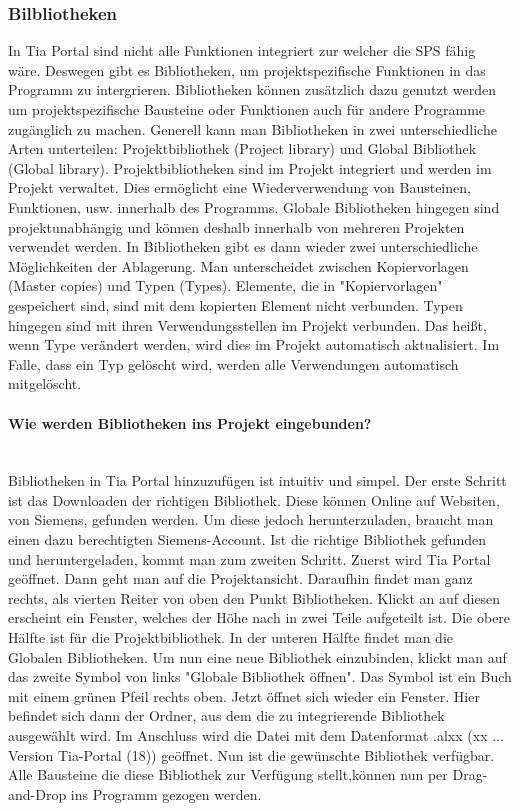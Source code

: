     \subsubsection{Bilbliotheken } \mbox{}
    In Tia Portal sind nicht alle Funktionen integriert zur welcher die SPS fähig wäre. Deswegen gibt es Bibliotheken, um projektspezifische Funktionen in das Programm zu intergrieren. Bibliotheken können zusätzlich dazu genutzt werden um projektspezifische Bausteine oder Funktionen auch für andere Programme zugänglich zu machen. Generell kann man Bibliotheken in zwei unterschiedliche Arten unterteilen: Projektbibliothek (Project library) und Global Bibliothek (Global library). Projektbibliotheken sind im Projekt integriert und werden im Projekt verwaltet. Dies ermöglicht eine Wiederverwendung von Bausteinen, Funktionen, usw. innerhalb des Programms. Globale Bibliotheken hingegen sind projektunabhängig und können deshalb innerhalb von mehreren Projekten verwendet werden. In Bibliotheken gibt es dann wieder zwei unterschiedliche Möglichkeiten der Ablagerung. Man unterscheidet zwischen Kopiervorlagen (Master copies) und Typen (Types). Elemente, die in "Kopiervorlagen" gespeichert sind, sind mit dem kopierten Element nicht verbunden. Typen hingegen sind mit ihren Verwendungsstellen im Projekt verbunden. Das heißt, wenn Type verändert werden, wird dies im Projekt automatisch aktualisiert. Im Falle, dass ein Typ gelöscht wird, werden alle Verwendungen automatisch mitgelöscht.  
    \cite{Programmierleitfaden_für_S7-1500}


        \paragraph{Wie werden Bibliotheken ins Projekt eingebunden?} \mbox{} \\
        \label{Bilbliotheken}
        Bibliotheken in Tia Portal hinzuzufügen ist intuitiv und simpel. Der erste Schritt ist das Downloaden der richtigen Bibliothek. Diese können Online auf Websiten, von Siemens, gefunden werden. Um diese jedoch herunterzuladen, braucht man einen dazu berechtigten Siemens-Account. Ist die richtige Bibliothek gefunden und heruntergeladen, kommt man zum zweiten Schritt. Zuerst wird Tia Portal geöffnet. Dann geht man auf die Projektansicht. Daraufhin findet man ganz rechts, als vierten Reiter von oben den Punkt Bibliotheken. Klickt an auf diesen erscheint ein Fenster, welches der Höhe nach in zwei Teile aufgeteilt ist. Die obere Hälfte ist für die Projektbibliothek. In der unteren Hälfte findet man die Globalen Bibliotheken. Um nun eine neue Bibliothek einzubinden, klickt man auf das zweite Symbol von links "Globale Bibliothek öffnen". Das Symbol ist ein Buch mit einem grünen Pfeil rechts oben. Jetzt öffnet sich wieder ein Fenster. Hier befindet sich  dann der Ordner, aus dem die zu integrierende Bibliothek ausgewählt wird. Im Anschluss wird die Datei mit dem Datenformat .alxx (xx ... Version Tia-Portal (18)) geöffnet. Nun ist die gewünschte Bibliothek verfügbar. Alle Bausteine die diese Bibliothek zur Verfügung stellt,können nun per Drag-and-Drop ins Programm gezogen werden.
        \cite{Bibliotheken}


